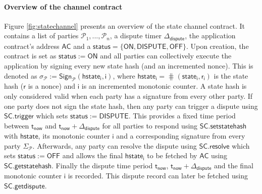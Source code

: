 \documentclass{llncs}
\newcommand{\chanstatus}{\mathsf{status}}
\newcommand{\chanon}{\mathsf{ON}}
\newcommand{\chandispute}{\mathsf{DISPUTE}}
\newcommand{\chanoff}{\mathsf{OFF}}
\newcommand{\cmd}{\mathsf{cmd}}
\newcommand{\hstate}{\mathsf{hstate}}
\newcommand{\hstatei}{\mathsf{hstate}_{\monotoniccounter}}
\newcommand{\hstateplus}{\ensuremath{\mathsf{hstate}_{\monotoniccounter+1}}}
\newcommand{\monotoniccounter}{\mathsf{i}}
\newcommand{\stateinfoi}{\mathsf{state}_{\mathsf{i}}}
\newcommand{\stateinfoplus}{\mathsf{state}_{\mathsf{i+1}}}
\newcommand{\participant}{\mathcal{P}}
\newcommand{\rani}{\mathsf{r}_{\mathsf{i}}}
\newcommand{\ran}{\mathsf{r}}
\newcommand{\statechanneldispute}{\mathsf{SC}.\mathsf{trigger}}
\newcommand{\statechannelsetstate}{\mathsf{SC}.\mathsf{setstatehash}}
\newcommand{\statechannelresolve}{\mathsf{SC}.\mathsf{resolve}}
\newcommand{\statechannelgetcommitment}{\mathsf{SC}.\mathsf{getstatehash}}
\newcommand{\statechannelgetdispute}{\mathsf{SC}.\mathsf{getdispute}}
\newcommand{\sign}{\mathsf{Sign}}
\newcommand{\appcontract}{\mathsf{AC}}
\newcommand{\timerdispute}{\mathsf{\Delta}_{\mathsf{dispute}}}
\newcommand{\timenow}{\mathsf{t}_{\mathsf{now}}}
\newcommand{\timedispute}{\timenow + \mathsf{\Delta}_{\mathsf{dispute}}}
\begin{document}
\paragraph{Overview of the channel contract} 
Figure \ref{fig:statechannel} presents an overview of the state channel contract. 
It contains a list of parties $\participant_{1},...,\participant_{n}$, a dispute timer $\timerdispute$, the application contract's address $\appcontract$ and a  $\chanstatus = \{\chanon, \chandispute, \chanoff\}.$
Upon creation, the contract is set as $\chanstatus := \chanon$ and all parties can collectively execute the application by signing every new state hash (and an incremented nonce).
This is denoted as $\sigma_{\participant} := \sign_{\participant}(\hstatei, \monotoniccounter)$, where  $\hstatei = \hash(\stateinfoi, \rani)$ is the state hash ($\ran$ is a nonce) and $\monotoniccounter$ is an incremented monotonic counter. 
A state hash is only considered valid when each party has a signature from every other party. 
If one party does not sign the state hash, then any party can trigger a dispute using $\statechanneldispute$ which sets $\chanstatus := \chandispute$. 
This provides a fixed time period between $\timenow$ and $\timedispute$ for all parties to respond using $\statechannelsetstate$ with $\hstate$, its monotonic counter $\monotoniccounter$ and a corresponding signature from every party $\Sigma_{\participant}$. 
Afterwards, any party can resolve the dispute using $\statechannelresolve$ which sets $\chanstatus := \chanoff$ and allows the final $\hstatei$ to be fetched by $\appcontract$ using  $\statechannelgetcommitment$. 
Finally the dispute time period $\timenow$, $\timedispute$ and the final monotonic counter $\monotoniccounter$ is recorded.
This dispute record can later be fetched using $\statechannelgetdispute$. 
%
%
\end{document}
